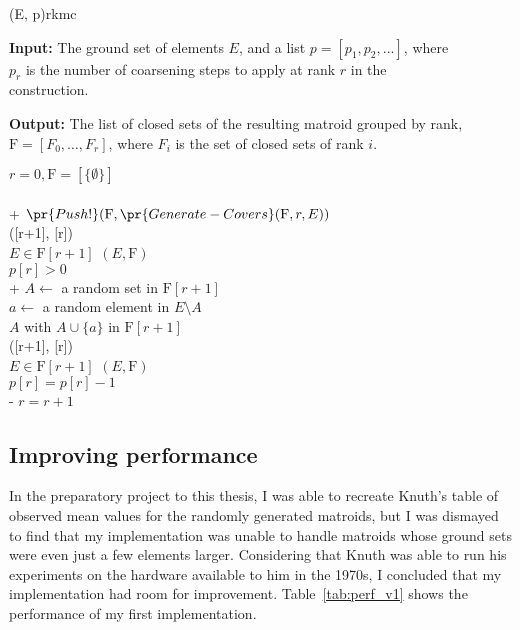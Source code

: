 \begin{algorithm}[float*=ht!]{(E, p)}{rkmc}

  \textbf{Input:}     \tab The ground set of elements $E$, and a list $p = [p_1, p_2, ...]$, where \\
  \mbox{}\tab $p_r$ is the number of coarsening steps to apply at rank $r$ in the \\
  \mbox{}\tab construction.

  \textbf{Output:}    \tab The list of closed sets of the resulting matroid grouped by rank, \\
  \mbox{}\tab $\mathrm{F} = [F_0, \ldots, F_r]$, where $F_i$ is the set of closed sets of rank $i$.

  \begin{pseudo}[label=\small\arabic*, indent-mark, line-height=1.2]
    $r = 0, \mathrm{F} = [\{ \emptyset \}]$ \\
       \\+
      $\pr{Push!}(\mathrm{F}, \pr{Generate-Covers}(\mathrm{F}, r, E))$ \\
      ([r+1], [r]) \\
      
       $E \in \mathrm{F}[r+1]$  $(E, \mathrm{F})$ \\
      
       $p[r] > 0$ \\+
        $A \leftarrow$ a random set in $\mathrm{F}[r+1]$ \\
        $a \leftarrow$ a random element in $E \setminus A$ \\
         $A$ with $A \cup \{a\}$ in $\mathrm{F}[r+1]$ \\
        ([r+1], [r]) \\

         $E \in \mathrm{F}[r+1]$  $(E, \mathrm{F})$ \\

        $p[r] = p[r] - 1$ \\-
      $r = r + 1$

  \end{pseudo}

\end{algorithm}


\subsection{Improving performance}
\label{sec:improving-performance}
In the preparatory project to this thesis, I was able to recreate Knuth's table of observed mean values for the randomly generated matroids, but I was dismayed to find that my implementation was unable to handle matroids whose ground sets were even just a few elements larger. Considering that Knuth was able to run his experiments on the hardware available to him in the 1970s, I concluded that my implementation had room for improvement. Table~\ref{tab:perf_v1} shows the performance of my first implementation.

